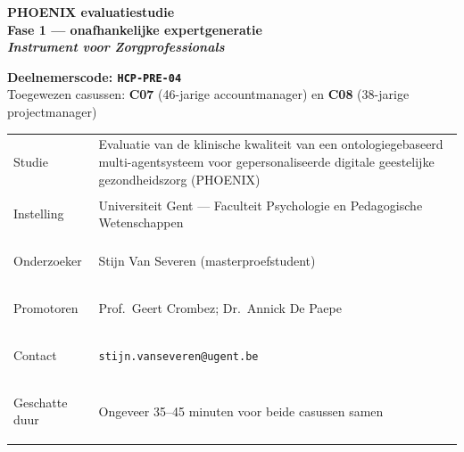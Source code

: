 \documentclass[11pt,a4paper]{article}
\renewcommand{\arraystretch}{1.28}
\begin{document}
\begin{titlepage}
\centering\vspace*{0.6cm}

\begin{tcolorbox}[
  colback=DarkBlue,colframe=DarkBlue,
  arc=3mm,left=14pt,right=14pt,top=12pt,bottom=12pt,
  width=\textwidth
]
\centering
{\fontsize{22}{28}\selectfont\bfseries\color{white}
PHOENIX evaluatiestudie\\[0.3em]
\fontsize{15}{20}\selectfont\color{AccentBlue}
Fase 1 --- onafhankelijke expertgeneratie\\[0.2em]
\fontsize{12}{16}\selectfont\color{white}
\textit{Instrument voor Zorgprofessionals}
}
\end{tcolorbox}

\vspace{0.7cm}

\begin{tcolorbox}[
  colback=AccentBlue,colframe=PrimaryBlue,
  arc=2.5mm,boxrule=1.2pt,left=12pt,right=12pt,top=10pt,bottom=10pt,
  width=0.86\textwidth
]
\centering
{\large\bfseries\color{DarkBlue}Deelnemerscode: \texttt{HCP-PRE-04}}\\[0.5em]
{\normalsize\color{SlateMid}
Toegewezen casussen:\quad
\textbf{\color{PrimaryBlue}C07} (46-jarige accountmanager)
\quad en \quad
\textbf{\color{PrimaryBlue}C08} (38-jarige projectmanager)
}
\end{tcolorbox}

\vspace{0.6cm}

\begin{tcolorbox}[
  colback=SoftBG,colframe=BorderGrey,
  arc=2mm,left=10pt,right=10pt,top=9pt,bottom=9pt,
  width=0.92\textwidth
]
\small\renewcommand{\arraystretch}{1.28}
\begin{tabularx}{\textwidth}{@{}>{\bfseries\raggedright\arraybackslash}p{}X@{}}
Studie & Evaluatie van de klinische kwaliteit van een ontologiegebaseerd multi-agentsysteem voor gepersonaliseerde digitale geestelijke gezondheidszorg (PHOENIX) \\
Instelling & Universiteit Gent --- Faculteit Psychologie en Pedagogische Wetenschappen \\
Onderzoeker & Stijn Van Severen (masterproefstudent) \\
Promotoren & Prof.\ Geert Crombez; Dr.\ Annick De Paepe \\
Contact & \texttt{stijn.vanseveren@ugent.be} \\
Geschatte duur & Ongeveer 35--45 minuten voor beide casussen samen \\
\end{tabularx}
\end{tcolorbox}


\end{titlepage}
\end{document}
